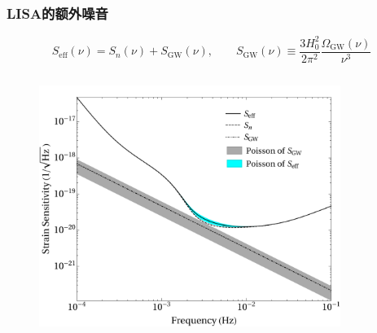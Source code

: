 \documentclass[xcolor={svgnames},compress]{beamer}
\begin{document}
\begin{frame}
    \frametitle{LISA的额外噪音}
    \vspace{-2mm}
    \begin{block}{}\vspace{-1mm}
        \small{
        \[S_{\mathrm{eff}}(\nu)=S_{n}(\nu)+S_{\mathrm{GW}}(\nu),
        \quad \quad
        S_{\mathrm{GW}}(\nu) \equiv \frac{3 H_{0}^2}{2 \pi^2}
        \frac{\Omega_{\mathrm{GW}}(\nu)}{\nu^3} 
        \]
    }\vspace{-3mm}
    \end{block}
    \vspace{-3mm}
    \begin{columns}
        \begin{column}{0.54\textwidth} 
            \begin{figure}[htbp!]
                \centering
                \includegraphics[width = \textwidth]{./pic/lisa-sensitivity-PBH-power.pdf}
            \end{figure}
        \end{column}
        \begin{column}{0.54\textwidth} 
            \begin{figure}[htbp!]
                \centering

\end{figure}
\end{column}
\end{columns}
\end{frame}
\end{document}
